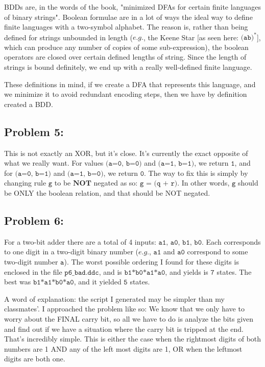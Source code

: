 \documentclass[a4paper]{article}
\begin{document}
BDDs are, in the words of the book, "minimized DFAs for certain finite languages of binary strings". Boolean formulae are in a lot of ways the ideal way to define finite languages with a two-symbol alphabet. The reason is, rather than being defined for strings unbounded in length ($\textit{e.g.}$, the Keene Star [as seen here: $\texttt{(ab)}^*$], which can produce any number of copies of some sub-expression), the boolean operators are closed over certain defined lengths of string. Since the length of strings is bound definitely, we end up with a really well-defined finite language.

These definitions in mind, if we create a DFA that represents this language, and we minimize it to avoid redundant encoding steps, then we have by definition created a BDD.

\subsection*{Problem 5:}

This is not exactly an XOR, but it's close. It's currently the exact opposite of what we really want. For values $\texttt{(a=0, b=0)}$ and $\texttt{(a=1, b=1)}$, we return $\texttt{1}$, and for $\texttt{(a=0, b=1)}$ and $\texttt{(a=1, b=0)}$, we return $\texttt{0}$. The way to fix this is simply by changing rule $\texttt{g}$ to be $\textbf{NOT}$ negated as so: $\texttt{g = (q + r)}$. In other words, $\texttt{g}$ should be ONLY the boolean relation, and that should be NOT negated.

\subsection*{Problem 6:} For a two-bit adder there are a total of 4 inputs: $\texttt{a1, a0, b1, b0}$. Each corresponds to one digit in a two-digit binary number ($\textit{e.g.}$, $\texttt{a1}$ and $\texttt{a0}$ correspond to some two-digit number $\texttt{a}$). The worst possible ordering I found for these digits is enclosed in the file $\texttt{p6\_bad.ddc}$, and is $\texttt{b1*b0*a1*a0}$, and yields  is $\texttt{7}$ states. The best was $\texttt{b1*a1*b0*a0}$, and it yielded $\texttt{5}$ states.

A word of explanation: the script I generated may be simpler than my classmates'. I approached the problem like so: We know that we only have to worry about the FINAL carry bit, so all we have to do is analyze the bits given and find out if we have a situation where the carry bit is tripped at the end. That's incredibly simple. This is either the case when the rightmost digits of both numbers are 1 AND any of the left most digits are 1, OR when the leftmost digits are both one.
\end{document}
